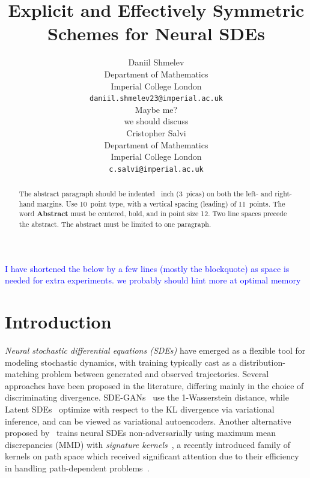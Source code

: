 \documentclass{article}
\title{Explicit and Effectively Symmetric Schemes for Neural SDEs}
\author{%
  Daniil Shmelev\\
  Department of Mathematics\\
  Imperial College London\\
  \texttt{daniil.shmelev23@imperial.ac.uk} \\
  \And
  Maybe me?\\
  we should discuss\\
  \And
  Cristopher Salvi\\
  Department of Mathematics\\
  Imperial College London\\
  \texttt{c.salvi@imperial.ac.uk} \\
}
\theoremstyle{definition}
\theoremstyle{remark}
\begin{document}
\maketitle


\begin{abstract}
  The abstract paragraph should be indented ~inch (3~picas) on both the left- and right-hand margins. Use 10~point type, with a vertical spacing (leading) of 11~points. The word \textbf{Abstract} must be centered, bold, and in point size 12. Two line spaces precede the abstract. The abstract must be limited to one paragraph.
\end{abstract}


\newcommand{\luke}[1]{\textcolor{blue}{#1}}
\luke{I have shortened the below by a few lines (mostly the blockquote) as space is needed for extra experiments. we probably should hint more at optimal memory}
\section{Introduction}
\emph{Neural stochastic differential equations (SDEs)} have emerged as a flexible tool for modeling stochastic dynamics, with training typically cast as a distribution-matching problem between generated and observed trajectories. Several approaches have been proposed in the literature, differing mainly in the choice of discriminating divergence. SDE-GANs~\citep{kidger2021neural} use the 1-Wasserstein distance, while Latent SDEs~\citep{li2020scalable} optimize with respect to the KL divergence via variational inference, and can be viewed as variational autoencoders. Another alternative proposed by~\cite{issa2023non} trains neural SDEs non-adversarially using maximum mean discrepancies (MMD) with \emph{signature kernels}~\citep{kiraly2019kernels, salvi2021signature, lemercier2024log}, a recently introduced family of kernels on path space which received significant attention due to their efficiency in handling path-dependent problems~\citep{salvi2021higher, lemercier2021distribution, pannier2024path, cirone2025rough}.
\end{document}
